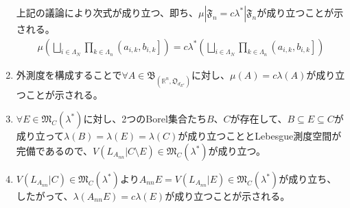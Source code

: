 \documentclass[dvipdfmx]{jsarticle}
\begin{document}
\begin{enumerate}
  上記の議論により次式が成り立つ、即ち、$\mu|\mathfrak{F}_{n} = c\lambda^{*}|\mathfrak{F}_{n}$が成り立つことが示される。
  \begin{align*}
  \mu\left( \bigsqcup_{i \in \varLambda_{N}} {\prod_{k \in \varLambda_{n}} \left( a_{i,k},b_{i,k} \right]} \right) = c\lambda^{*}\left( \bigsqcup_{i \in \varLambda_{N}} {\prod_{k \in \varLambda_{n}} \left( a_{i,k},b_{i,k} \right]} \right)
  \end{align*}
\item
  外測度を構成することで$\forall A \in \mathfrak{B}_{\left( \mathbb{R}^{n},\mathfrak{O}_{d_{E^{n}}} \right)}$に対し、$\mu(A) = c\lambda(A)$が成り立つことが示される。
\item
  $\forall E \in \mathfrak{M}_{C}\left( \lambda^{*} \right)$に対し、2つのBorel集合たち$B$、$C$が存在して、$B \subseteq E \subseteq C$が成り立って$\lambda(B) = \lambda(E) = \lambda(C)$が成り立つこととLebesgue測度空間が完備であるので、$V\left( L_{A_{nn}}|C \setminus E \right) \in \mathfrak{M}_{C}\left( \lambda^{*} \right)$が成り立つ。
\item
  $V\left( L_{A_{nn}}|C \right) \in \mathfrak{M}_{C}\left( \lambda^{*} \right)$より$A_{nn}E = V\left( L_{A_{nn}}|E \right) \in \mathfrak{M}_{C}\left( \lambda^{*} \right)$が成り立ち、したがって、$\lambda\left( A_{nn}E \right) = c\lambda(E)$が成り立つことが示される。
\end{enumerate}
\end{document}
